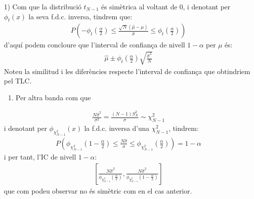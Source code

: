 \documentclass[letterpaper,10pt,english]{sphinxmanual}
\begin{document}
1) Com que la distribució \(t_{N-1}\) és simètrica
al voltant de 0, i denotant per \(\phi_t(x)\)
la seva f.d.c. inversa, tindrem que:
\begin{equation*}
\begin{split}P(-\phi_t(\frac{\alpha}{2}) \leq \frac{\sqrt{N}(\hat{\mu} - \mu)}{\hat{\sigma}} \leq \phi_t(\frac{\alpha}{2}))\end{split}
\end{equation*}
d’aquí podem concloure que l’interval de confiança de nivell \(1 - \alpha\)
per \(\mu\) és:
\begin{equation*}
\begin{split}\hat{\mu} \pm \phi_t(\frac{\alpha}{2})\sqrt{\frac{\hat{\sigma}^2}{N}}\end{split}
\end{equation*}
Noteu la similitud i les diferències respecte l’interval de confiança que obtindriem pel TLC.
\begin{enumerate}
%
\setcounter{enumi}{1}
\item {} 
Per altra banda com que

\end{enumerate}
\begin{equation*}
\begin{split}\frac{N \hat{\sigma}^2}{\sigma^2} = \frac{(N-1)S_X^2}{\sigma} \sim \chi_{N-1}^2\end{split}
\end{equation*}
i denotant per \(\phi_{\chi_{N-1}^2}(x)\) la f.d.c. inversa
d’una \(\chi_{N-1}^2\), tindrem:
\begin{equation*}
\begin{split}P\left(\phi_{\chi_{N-1}^2}(1 - \frac{\alpha}{2}) \leq \frac{N \hat{\sigma}}{\sigma} \leq \phi_{\chi_{N-1}^2}(\frac{\alpha}{2})\right) = 1- \alpha\end{split}
\end{equation*}
i per tant, l’IC de nivell \(1-\alpha\):
\begin{equation*}
\begin{split}\left[\frac{N \hat{\sigma}^2}{\phi_{\chi_{N-1}^2}(\frac{\alpha}{2})}, \frac{N \hat{\sigma}^2}{\phi_{\chi_{N-1}^2}(1 - \frac{\alpha}{2})}\right]\end{split}
\end{equation*}
que com podeu observar no és simètric com en el cas anterior.
\end{document}
